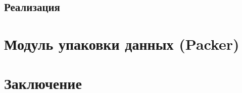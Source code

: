\documentclass[a4paper, 14pt]{extarticle}
\begin{document}
    \subsection{Реализация}
    
    \newpage

\section{Модуль упаковки данных (Packer)}
    
\newpage

\section*{Заключение}
    
    \newpage

%
\printbibliography

\end{document}
